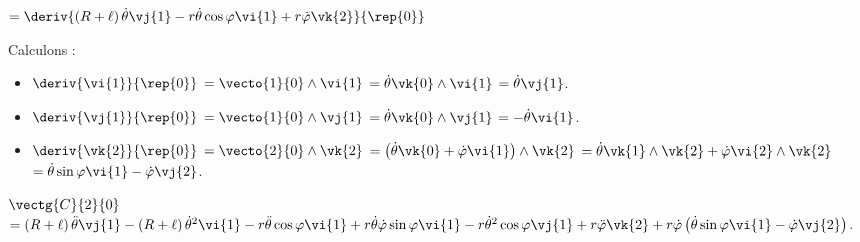 \begin{corrigebox}
 $ = \deriv{\left(R+\ell\right)\dot{\theta}\vj{1} -r\dot{\theta}\cos\varphi \vi{1} + r\dot{\varphi}\vk{2}}{\rep{0}}$
 
 Calculons : 
\begin{itemize}
\item $\deriv{\vi{1}}{\rep{0}}$ $=\vecto{1}{0} \wedge \vi{1}$ $=\dot{\theta}\vk{0} \wedge \vi{1}$ $=\dot{\theta}\vj{1}$.
\item $\deriv{\vj{1}}{\rep{0}}$ $=\vecto{1}{0} \wedge \vj{1}$ $=\dot{\theta}\vk{0} \wedge \vj{1}$ $=-\dot{\theta}\vi{1}$.
\item $\deriv{\vk{2}}{\rep{0}}$ $=\vecto{2}{0} \wedge \vk{2}$ 
$=\left(\dot{\theta}\vk{0}+ \dot{\varphi}\vi{1} \right) \wedge \vk{2}$
$=\dot{\theta}\vk{1} \wedge \vk{2}+ \dot{\varphi}\vi{2}  \wedge \vk{2}$
$=\dot{\theta}\sin\varphi\vi{1}- \dot{\varphi}\vj{2}$.
\end{itemize}

$\vectg{C}{2}{0}$ 
$ =\left(R+\ell\right)\ddot{\theta}\vj{1} -\left(R+\ell\right)\dot{\theta}^2\vi{1} 
-r\ddot{\theta}\cos\varphi \vi{1} +r\dot{\theta}\dot{\varphi}\sin\varphi \vi{1} -r\dot{\theta}^2\cos\varphi \vj{1} 
+ r\ddot{\varphi}\vk{2}+ r\dot{\varphi}\left(\dot{\theta}\sin\varphi\vi{1}- \dot{\varphi}\vj{2} \right)$.
\end{corrigebox}
